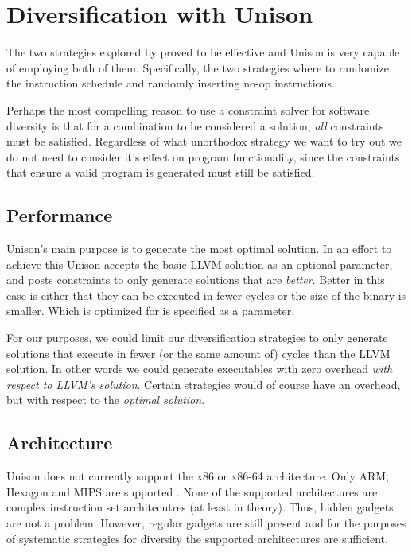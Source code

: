 \chapter{Diversification with Unison}

The two strategies explored by \textcite{large-scale-automated} proved to be
effective and Unison is very capable of employing both of them. Specifically, the two
strategies where to randomize the instruction schedule and randomly inserting no-op
instructions.

Perhaps the most compelling reason to use a constraint solver for software diversity is that
for a combination to be considered a solution, \textit{all} constraints must be satisfied.
Regardless of what unorthodox strategy we want to try out we do not need to consider it's
effect on program functionality, since the constraints that ensure a valid program is
generated must still be satisfied.




\section{Performance}

Unison's main purpose is to generate the most optimal solution. In an effort to achieve 
this Unison accepts the basic LLVM-solution as an optional parameter, and posts constraints
to only generate solutions that are \textit{better}. Better in this case is either that
they can be executed in fewer cycles or the size of the binary is smaller. Which is optimized
for is specified as a parameter.

For our purposes, we could limit our diversification strategies to only generate solutions
that execute in fewer (or the same amount of) cycles than the LLVM solution. In other words
we could generate executables with zero overhead \textit{with respect to LLVM's solution}.
Certain strategies would of course have an overhead, but with respect to the \textit{optimal
solution}.

\section{Architecture}

Unison does not currently support the x86 or x86-64 architecture. Only ARM, Hexagon and MIPS
are supported \cite{unison-src}. None of the supported architectures are complex instruction
set architecutres (at least in theory). Thus, hidden gadgets are not a problem. However,
regular gadgets are still present and for the purposes of systematic strategies for
diversity the supported architectures are sufficient.
